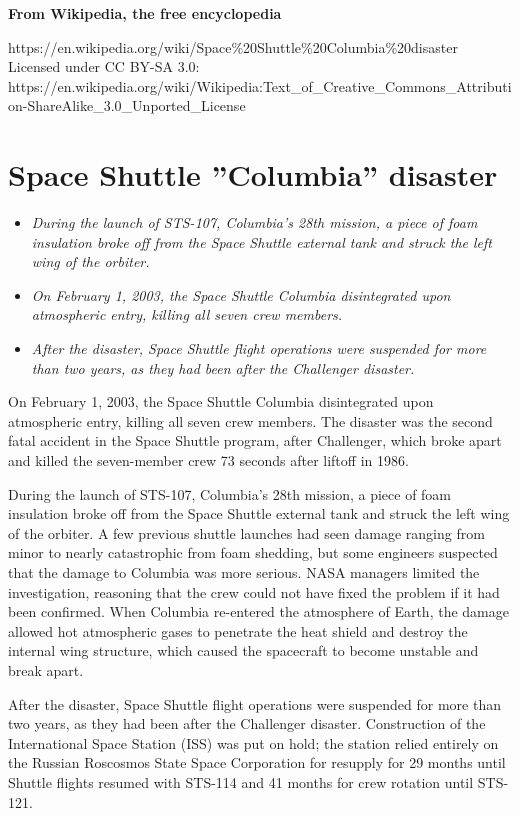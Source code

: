 \textbf{From Wikipedia, the free encyclopedia}

https://en.wikipedia.org/wiki/Space\%20Shuttle\%20Columbia\%20disaster\\
Licensed under CC BY-SA 3.0:\\
https://en.wikipedia.org/wiki/Wikipedia:Text\_of\_Creative\_Commons\_Attribution-ShareAlike\_3.0\_Unported\_License

\section{Space Shuttle ''Columbia''
disaster}\label{space-shuttle-columbia-disaster}

\begin{itemize}
\item
  \emph{During the launch of STS-107, Columbia's 28th mission, a piece
  of foam insulation broke off from the Space Shuttle external tank and
  struck the left wing of the orbiter.}
\item
  \emph{On February 1, 2003, the Space Shuttle Columbia disintegrated
  upon atmospheric entry, killing all seven crew members.}
\item
  \emph{After the disaster, Space Shuttle flight operations were
  suspended for more than two years, as they had been after the
  Challenger disaster.}
\end{itemize}

On February 1, 2003, the Space Shuttle Columbia disintegrated upon
atmospheric entry, killing all seven crew members. The disaster was the
second fatal accident in the Space Shuttle program, after Challenger,
which broke apart and killed the seven-member crew 73 seconds after
liftoff in 1986.

During the launch of STS-107, Columbia's 28th mission, a piece of foam
insulation broke off from the Space Shuttle external tank and struck the
left wing of the orbiter. A few previous shuttle launches had seen
damage ranging from minor to nearly catastrophic from foam shedding, but
some engineers suspected that the damage to Columbia was more serious.
NASA managers limited the investigation, reasoning that the crew could
not have fixed the problem if it had been confirmed. When Columbia
re-entered the atmosphere of Earth, the damage allowed hot atmospheric
gases to penetrate the heat shield and destroy the internal wing
structure, which caused the spacecraft to become unstable and break
apart.

After the disaster, Space Shuttle flight operations were suspended for
more than two years, as they had been after the Challenger disaster.
Construction of the International Space Station (ISS) was put on hold;
the station relied entirely on the Russian Roscosmos State Space
Corporation for resupply for 29 months until Shuttle flights resumed
with STS-114 and 41 months for crew rotation until STS-121.

